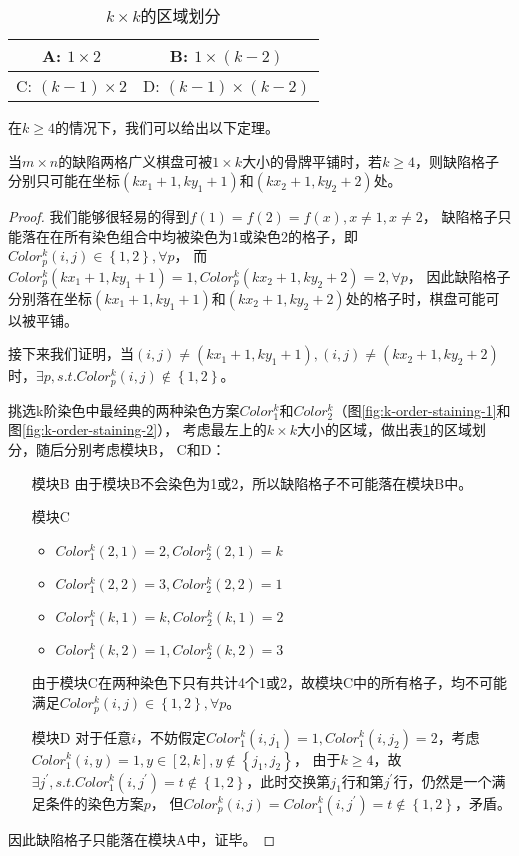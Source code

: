 \begin{table}[htbp]
	\centering
	\caption{$k \times k$的区域划分}
	\begin{tabular}{|c|c|}
		\hline
		A: $1 \times 2$       & B: $1  \times (k - 2)$     \\
		\hline
		C: $(k - 1) \times 2$ & D: $(k - 1)\times (k - 2)$ \\
		\hline
	\end{tabular}
	\label{fig:k-division}
\end{table}

在$k \ge 4$的情况下，我们可以给出以下定理。
\begin{theorem}
	\label{basic-theorem-3}
	当$m \times n$的缺陷两格广义棋盘可被$1 \times k$大小的骨牌平铺时，若$k \ge 4$，则缺陷格子分别只可能在坐标$(kx_1 + 1, ky_1 + 1)$和$(kx_2 + 1, ky_2 + 2)$处。
\end{theorem}
\begin{proof}
	我们能够很轻易的得到$f(1) = f(2) = f(x), x \neq 1, x \neq 2$，
	缺陷格子只能落在在所有染色组合中均被染色为1或染色2的格子，即$Color^k_p(i, j) \in \left\{1, 2\right\},  \forall p$，
	而$Color^k_p(kx_1 + 1, ky_1 + 1) = 1, Color^k_p(kx_2 + 1, ky_2 + 2) = 2, \forall p$，
	因此缺陷格子分别落在坐标$(kx_1 + 1, ky_1 + 1)$和$(kx_2 + 1, ky_2 + 2)$处的格子时，棋盘可能可以被平铺。

	接下来我们证明，当$(i, j) \neq (kx_1 + 1, ky_1 + 1), (i, j) \neq (kx_2 + 1, ky_2 + 2)$时，$\exists p, s.t. Color^k_p(i, j) \notin \left\{1, 2\right\}$。

	挑选k阶染色中最经典的两种染色方案$Color^k_1$和$Color^k_2$（图\ref{fig:k-order-staining-1}和图\ref{fig:k-order-staining-2}），
	考虑最左上的$k \times k$大小的区域，做出表\ref{fig:k-division}的区域划分，随后分别考虑模块B， C和D：

	\begin{itemize}
		\item[模块B] 由于模块B不会染色为1或2，所以缺陷格子不可能落在模块B中。
		\item[模块C]
			\begin{itemize}
				\item $Color^k_1(2, 1) = 2, Color^k_2(2, 1) = k$
				\item $Color^k_1(2, 2) = 3, Color^k_2(2, 2) = 1$
				\item $Color^k_1(k, 1) = k, Color^k_2(k, 1) = 2$
				\item $Color^k_1(k, 2) = 1, Color^k_2(k, 2) = 3$
			\end{itemize}
			由于模块C在两种染色下只有共计4个1或2，故模块C中的所有格子，均不可能满足$Color^k_p(i, j) \in \left\{1, 2\right\}, \forall p$。
		\item[模块D] 对于任意$i$，不妨假定$Color^k_1(i, j_1) = 1, Color^k_1(i, j_2) = 2$，考虑$Color^k_1(i, y) = 1, y \in [2, k], y \notin \left\{j_1, j_2\right\}$，
			由于$k \ge 4$，故$\exists j^{'}, s.t. Color^k_1(i, j^{'}) = t \notin \left\{1, 2\right\}$，此时交换第$j_1$行和第$j^{'}$行，仍然是一个满足条件的染色方案$p$，
			但$Color^k_p(i, j) = Color^k_1(i, j^{'}) = t \notin \left\{1, 2\right\}$，矛盾。
	\end{itemize}
	因此缺陷格子只能落在模块A中，证毕。
\end{proof}

